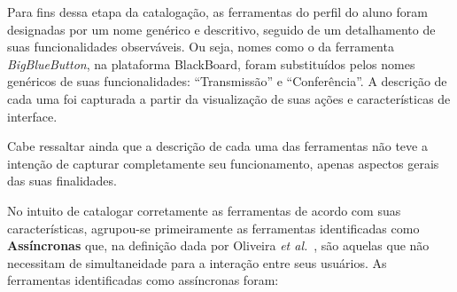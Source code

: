 Para fins dessa etapa da catalogação, as ferramentas do perfil do aluno foram designadas por um nome genérico e descritivo, seguido de um detalhamento de suas funcionalidades observáveis. Ou seja, nomes como o da ferramenta \emph{BigBlueButton}, na plataforma BlackBoard, foram substituídos pelos nomes genéricos de suas funcionalidades: ``Transmissão'' e ``Conferência''. A descrição de cada uma foi capturada a partir da visualização de suas ações e características de interface. 

Cabe ressaltar ainda que a descrição de cada uma das ferramentas não teve a intenção de capturar completamente seu funcionamento, apenas aspectos gerais das suas finalidades.

No intuito de catalogar corretamente as ferramentas de acordo com suas características, agrupou-se primeiramente as ferramentas identificadas como \textbf{Assíncronas} que, na definição dada por Oliveira \textit{et al.}~\cite{dotta@ead}, são aquelas que não necessitam de simultaneidade para a interação entre seus usuários. As ferramentas identificadas como assíncronas foram: 
